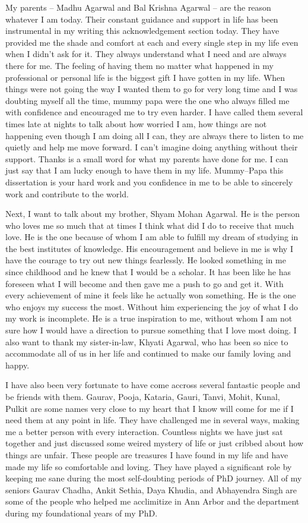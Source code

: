 My parents -- Madhu Agarwal and Bal Krishna Agarwal -- are the reason whatever I
am today. Their constant guidance and support in life has been instrumental in
my writing this acknowledgement section today. They have provided me the shade
and comfort at each and every single step in my life even when I didn't ask for
it. They always understand what I need and are always there for me. The feeling
of having them no matter what happened in my professional or personal life is
the biggest gift I have gotten in my life. When things were not going the way I
wanted them to go for very long time and I was doubting myself all the time,
mummy papa were the one who always filled me with confidence and encouraged me
to try even harder. I have called them several times late at nights to talk about
how worried I am, how things are not happening even though I am doing all I can,
they are always there to listen to me quietly and help me move forward. I can't
imagine doing anything without their support. Thanks is a small word for what my
parents have done for me. I can just say that I am lucky enough to have them in
my life. Mummy--Papa this dissertation is your hard work and you confidence in
me to be able to sincerely work and contribute to the world.

Next, I want to talk about my brother, Shyam Mohan Agarwal. He is the person who
loves me so much that at times I think what did I do to receive that much love.
He is the one because of whom I am able to fulfill my dream of studying in
the best institutes of knowledge. His encouragement and believe in me is why I
have the courage to try out new things fearlessly. He looked something in me
since childhood and he knew that I would be a scholar. It has been like he has
foreseen what I will become and then gave me a push to go and get it. With every
achievement of mine it feels like he actually won something. He is the one who
enjoys my success the most. Without him experiencing the joy of what I do my
work is incomplete. He is a true inspiration to me, without whom I am not sure
how I would have a direction to pursue something that I love most doing. I also
want to thank my sister-in-law, Khyati Agarwal, who has been so nice to
accommodate all of us in her life and continued to make our family loving and
happy.

I have also been very fortunate to have come accross several fantastic people and be
friends with them. Gaurav, Pooja, Kataria, Gauri, Tanvi, Mohit, Kunal, Pulkit
are some names very close to my heart that I know will come for me if I need
them at any point in life. They have challenged me in several ways, making me a
better person with every interaction. Countless nights we have just sat together
and just discussed some weired mystery of life or just cribbed about how things
are unfair. These people are treasures I have found in my life and have made my
life so comfortable and loving. They have played a significant role by keeping
me sane during the most self-doubting periods of PhD journey. All of my seniors
Gaurav Chadha, Ankit Sethia, Daya Khudia, and Abhayendra Singh are some of the
people who helped me acclimitize in Ann Arbor and the department during my
foundational years of my PhD.

